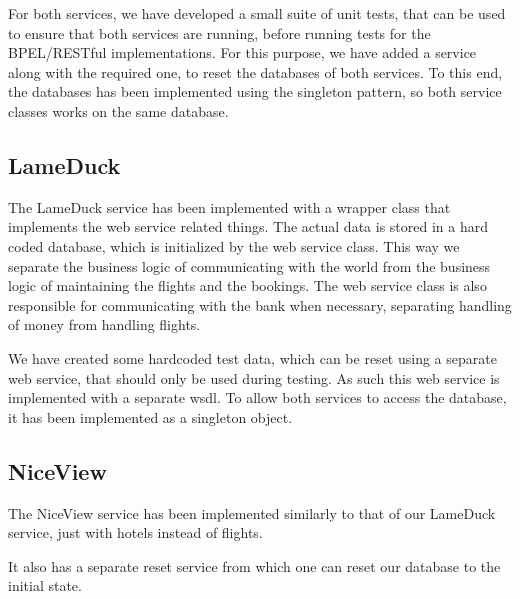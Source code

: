 For both services, we have developed a small suite of unit tests, that can be used to ensure that both services are running, before running tests for the BPEL/RESTful implementations. For this purpose, we have added a service along with the required one, to reset the databases of both services. To this end, the databases has been implemented using the singleton pattern, so both service classes works on the same database.


\subsection{LameDuck}
The LameDuck service has been implemented with a wrapper class that implements the web service related things. The actual data is stored in a hard coded database, which is initialized by the web service class. This way we separate the business logic of communicating with the world from the business logic of maintaining the flights and the bookings. The web service class is also responsible for communicating with the bank when necessary, separating handling of money from handling flights.

We have created some hardcoded test data, which can be reset using a separate web service, that should only be used during testing. As such this web service is implemented with a separate wsdl. To allow both services to access the database, it has been implemented as a singleton object.


\subsection{NiceView}
The NiceView service has been implemented similarly to that of our LameDuck service, just with hotels instead of flights.

It also has a separate reset service from which one can reset our database to the initial state.


